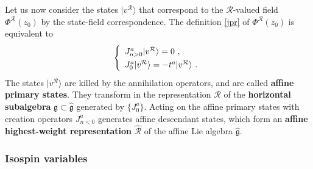 \documentclass[12pt, a4paper, notitlepage, twoside]{report}
\numberwithin{equation}{section}
\theoremstyle{break}
\begin{document}
Let us now consider the states $|v^\mathcal{R}\rangle$ that correspond to the $\mathcal{R}$-valued field $\Phi^\mathcal{R}(z_0)$ by the state-field correspondence.
The definition \eqref{jpr} of $\Phi^\mathcal{R}(z_0)$ is equivalent to 
\begin{align}
\renewcommand{\arraystretch}{1.3}
 \left\{\begin{array}{l}  J^a_{n>0}|v^\mathcal{R}\rangle = 0 \ ,  \\ J^a_0|v^\mathcal{R}\rangle = -t^a |v^\mathcal{R}\rangle\ . \end{array}\right. 
\end{align}
The states $|v^\mathcal{R}\rangle$ are killed by the annihilation operators, and are called \textbf{\boldmath affine primary states}.
They transform in the representation $\mathcal{R}$ of the \textbf{\boldmath horizontal subalgebra} $\mathfrak{g}\subset \hat{\mathfrak{g}}$ generated by $\{J^a_0\}$.
Acting on the affine primary states with creation operators $J^a_{n<0}$ generates affine descendant states, which form an \textbf{\boldmath affine highest-weight representation} $\hat{\mathcal{R}}$ of the affine Lie algebra $\hat{\mathfrak{g}}$.

\subsubsection{Isospin variables}
\end{document}
